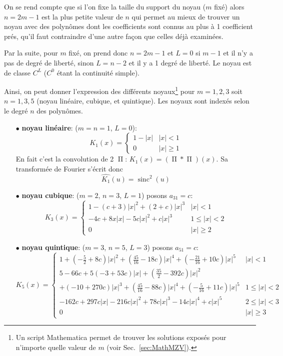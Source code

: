 \documentclass[11pt,twoside]{article}
\DeclareMathOperator{\sinc}{sinc}
\DeclareMathOperator{\boxcar}{{\mbox{$\Pi$}}}
\begin{document}
On se rend compte que si l'on fixe la taille du support du noyau ($m$ fixé) alors $n=2m-1$ est la plus petite valeur de $n$ qui permet au mieux de trouver un noyau avec des polynômes dont les coefficients sont connus au plus à 1 coefficient prés, qu'il faut contraindre d'une autre façon que celles déjà examinées. 

Par la suite, pour $m$ fixé, on prend donc $n=2m-1$ et $L=0$ si $m-1$ et il n'y a pas de degré de liberté, sinon $L=n-2$ et il y a 1 degré de liberté. Le noyau est de classe $C^L$ ($C^0$ étant la continuité simple).   

Ainsi, on peut donner l'expression des différents noyaux\footnote{Un script Mathematica permet de trouver les solutions exposés pour n'importe quelle valeur de $m$ (voir Sec.~\ref{sec:MathMZV}).} pour $m=1,2,3$ soit $n=1,3,5$ (noyau linéaire, cubique, et quintique). Les noyaux sont indexés selon le degré $n$ des polynômes.
\begin{itemize}
\item[$\bullet$ \textbf{noyau linéaire}:] ($m=n=1$, $L=0$):
\begin{equation}
K_1(x) = \begin{cases}
1-|x| & |x|< 1 \\
0 & |x| \geq 1
\end{cases}
\label{eq:interp-lineaire}
\end{equation}
En fait c'est la convolution de 2 $\boxcar$: $K_1(x) = (\boxcar \ast \boxcar)(x)$. Sa transformée de Fourier s'écrit donc
\begin{equation}
\hat{K_1}(u) = \sinc^2(u)
\end{equation}
\item[$\bullet$ \textbf{noyau cubique}:]  ($m=2$, $n=3$, $L=1$) posons $a_{31}=c$:
\begin{equation}
K_3(x) = \begin{cases}
1 -(c+3)|x|^2+(2+c)|x|^3 & |x|< 1 \\
-4c + 8x |x|-5c |x|^2+ c |x|^3 & 1\leq |x|<2 \\
0 & |x| \geq 2
\end{cases}
\label{eq:cubic-kernel}
\end{equation}
\item[$\bullet$ \textbf{noyau quintique}:] ($m=3$, $n=5$, $L=3$)  posons $a_{51}=c$:
\begin{equation}
K_5(x) = \begin{cases}
1 +\left(-\frac{5}{2}+8c\right) |x|^2+\left(\frac{45}{16}-18c\right)|x|^4
+ \left(-\frac{21}{16}+10c\right)|x|^5 & |x|< 1 \\
5-66c + 5(-3+53c)|x|+\left(\frac{35}{2}-392c\right)|x|^2 &\\
+(-10+270c)|x|^3+\left(\frac{45}{16}-88c\right)|x|^4+ \left(-\frac{5}{16}+11c\right)|x|^5 & 1\leq |x|<2 \\
-162c + 297 c |x|-216 c|x|^2 + 78 c |x|^3-14 c |x|^4 + c |x|^5 & 2\leq |x|<3\\
0 & |x|\geq 3
\end{cases}
\label{eq:quinticMZV-kernel}
\end{equation}
\end{itemize}
\end{document}
